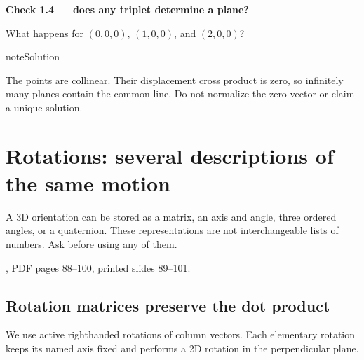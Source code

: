 \documentclass[letterpaper,11pt,english,openany,oneside]{jupyterBook}
\begin{document}
\begin{TextbookBox}
\textbf{Check 1.4 — does any triplet determine a plane?}\par\smallskip

\sphinxAtStartPar
What happens for \((0,0,0)\), \((1,0,0)\), and \((2,0,0)\)?

\end{TextbookBox}

\begin{sphinxadmonition}{note}{Solution}

\sphinxAtStartPar
The points are collinear. Their displacement cross product is zero, so infinitely many planes contain the common line. Do not normalize the zero vector or claim a unique solution.
\end{sphinxadmonition}

\sphinxstepscope


\section{Rotations: several descriptions of the same motion}
\label{\detokenize{lectures/lecture01/rotations:rotations-several-descriptions-of-the-same-motion}}\label{\detokenize{lectures/lecture01/rotations:lec01-rotations}}\label{\detokenize{lectures/lecture01/rotations::doc}}
\sphinxAtStartPar
A 3D orientation can be stored as a matrix, an axis and angle, three ordered angles, or a quaternion. These representations are not interchangeable lists of numbers. Ask  before using any of them.

\sphinxAtStartPar
{} , PDF pages 88–100, printed slides 89–101.


\subsection{Rotation matrices preserve the dot product}
\label{\detokenize{lectures/lecture01/rotations:rotation-matrices-preserve-the-dot-product}}
\sphinxAtStartPar
We use active right\sphinxhyphen{}handed rotations of column vectors. Each elementary rotation keeps its named axis fixed and performs a 2D rotation in the perpendicular plane.
\end{document}
